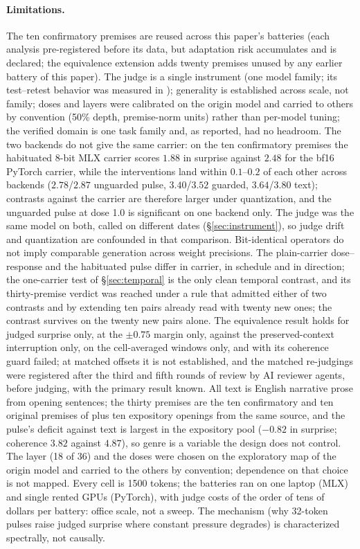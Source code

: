\documentclass[11pt]{article}
\begin{document}
\paragraph{Limitations.} The ten confirmatory premises are reused
across this paper's batteries (each analysis pre-registered before its
data, but adaptation risk accumulates and is declared; the equivalence
extension adds twenty premises unused by any earlier battery of this
paper). The judge is a single instrument (one model family; its
test--retest behavior was measured in \citealp{ono2026interrupting});
generality is established across scale, not family; doses and layers
were calibrated on the origin model and carried to others by
convention (50\% depth, premise-norm units) rather than per-model
tuning; the verified domain is one task family and, as reported, had
no headroom. The two backends do not give the same carrier: on the ten
confirmatory premises the habituated 8-bit MLX carrier scores $1.88$ in
surprise against $2.48$ for the bf16 PyTorch carrier, while the
interventions land within $0.1$--$0.2$ of each other across backends
($2.78$/$2.87$ unguarded pulse, $3.40$/$3.52$ guarded, $3.64$/$3.80$
text); contrasts against the carrier are therefore larger under
quantization, and the unguarded pulse at dose 1.0 is significant on one
backend only. The judge was the same model on both, called on different
dates (\S\ref{sec:instrument}), so judge drift and quantization are
confounded in that comparison. Bit-identical operators do not imply
comparable generation across weight precisions. The plain-carrier
dose--response and the habituated pulse differ in carrier, in schedule
and in direction; the one-carrier test of \S\ref{sec:temporal} is the
only clean temporal contrast, and its thirty-premise verdict was
reached under a rule that admitted either of two contrasts and by
extending ten pairs already read with twenty new ones; the contrast
survives on the twenty new pairs alone. The equivalence result holds
for judged surprise only, at the $\pm0.75$ margin only, against the
preserved-context interruption only, on the cell-averaged windows only,
and with its coherence guard failed; at matched offsets it is not
established, and the matched re-judgings were registered after the
third and fifth rounds of review by AI reviewer agents, before judging,
with the primary result known. All text is English narrative prose from opening sentences; the
thirty premises are the ten confirmatory and ten original premises of
\citet{ono2026interrupting} plus ten expository openings from the same
source, and the pulse's deficit against text is largest in the
expository pool ($-0.82$ in surprise; coherence $3.82$ against
$4.87$), so genre is a variable the design does not control. The layer
(18 of 36) and the doses were chosen on the exploratory map of the
origin model and carried to the others by convention; dependence on
that choice is not mapped. Every cell is 1500 tokens; the batteries
ran on one laptop (MLX) and single rented GPUs (PyTorch), with judge
costs of the order of tens of dollars per battery: office scale, not
a sweep. The mechanism (why 32-token pulses raise judged surprise where
constant pressure degrades) is characterized spectrally, not causally.
\end{document}
